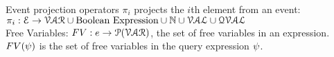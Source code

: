 % 
Event projection operators $\pi_i$ projects the $i$th element from an event: 
\\
$\pi_i : 
\mathcal{E} \to \mathcal{VAR}\cup \mbox{Boolean Expression}  \cup \mathbb{N} \cup \mathcal{VAL} \cup \mathcal{QVAL} $ 
\\
%
%
Free Variables: $FV: e \to \mathcal{P}(\mathcal{VAR})$, the set of free variables in an expression.
\\
$FV(\psi)$ is the set of free variables in the query expression $\psi$.
